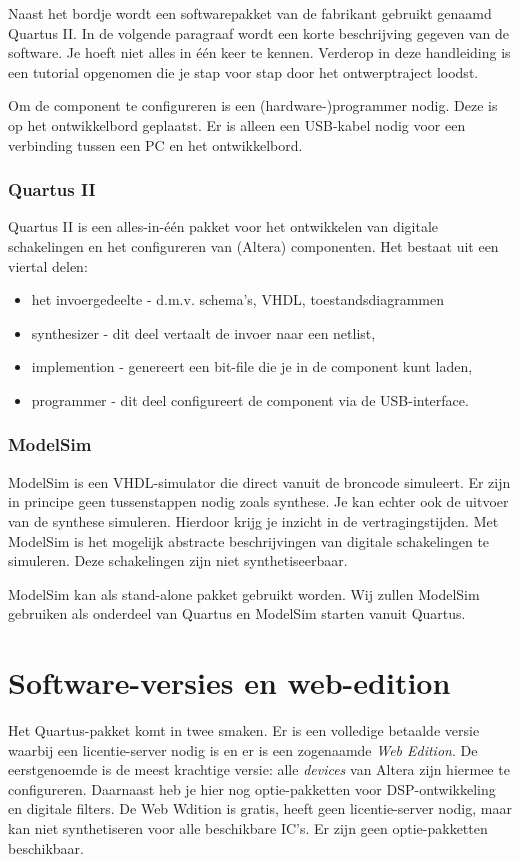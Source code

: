 \documentclass[a4paper,12pt,fleqn,twoside]{book}
\begin{document}
Naast het bordje wordt een softwarepakket van de fabrikant gebruikt genaamd
Quartus II. In de volgende paragraaf wordt een korte beschrijving gegeven van
de software. Je hoeft niet alles in \'{e}\'{e}n keer te kennen. Verderop in
deze handleiding is een tutorial opgenomen die je stap voor stap door het
ontwerptraject loodst.

Om de component te configureren is een (hardware-)programmer nodig. Deze is op
het ontwikkelbord geplaatst. Er is alleen een USB-kabel nodig voor een
verbinding tussen een PC en het ontwikkelbord.

\subsubsection{Quartus II}
Quartus II is een alles-in-\'{e}\'{e}n pakket voor het ontwikkelen van digitale
schakelingen en het configureren van (Altera) componenten. Het bestaat uit een
viertal delen:

\begin{itemize}\itemsep-1pt
\item het invoergedeelte - d.m.v. schema's, VHDL, toestandsdiagrammen
\item synthesizer - dit deel vertaalt de invoer naar een netlist,
\item implemention - genereert een bit-file die je in de component kunt laden,
\item programmer - dit deel configureert de component via de USB-interface.
\end{itemize}

\subsubsection{ModelSim}
ModelSim is een VHDL-simulator die direct vanuit de broncode simuleert. Er zijn
in principe geen tussenstappen nodig zoals synthese. Je kan echter ook de
uitvoer van de synthese simuleren. Hierdoor krijg je inzicht in de
vertragingstijden. Met ModelSim is het mogelijk abstracte beschrijvingen van
digitale schakelingen te simuleren. Deze schakelingen zijn niet
synthetiseerbaar.

ModelSim kan als stand-alone pakket gebruikt worden. Wij zullen ModelSim
gebruiken als onderdeel van Quartus en ModelSim starten vanuit Quartus.


\section{Software-versies en web-edition}
\label{sec:softwareversies}
Het Quartus-pakket komt in twee smaken. Er is een volledige betaalde versie
waarbij een licentie-server nodig is en er is een zogenaamde \textsl{Web
Edition}. De
eerstgenoemde is de meest krachtige versie: alle \textsl{devices} van Altera
zijn hiermee te configureren. Daarnaast heb je hier nog optie-pakketten voor
DSP-ontwikkeling en digitale filters. De Web Wdition is gratis, heeft geen 
licentie-server nodig, maar kan niet synthetiseren voor alle beschikbare IC's.
Er zijn geen optie-pakketten beschikbaar.
\end{document}
